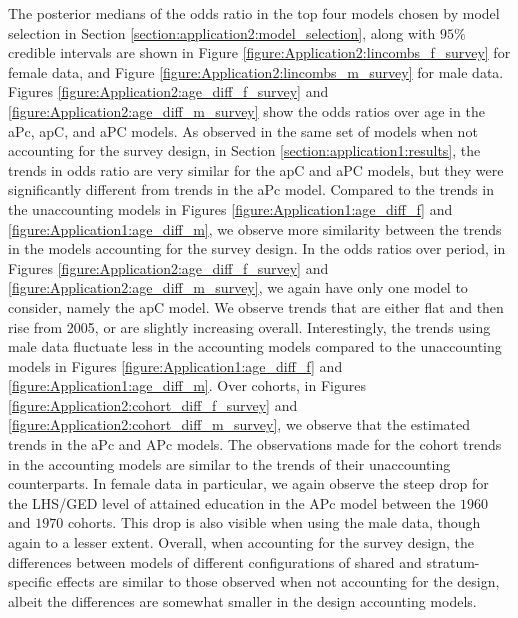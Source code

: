 \vspace{-0.2cm}
The posterior medians of the odds ratio in the top four models chosen by model selection in Section \ref{section:application2:model_selection}, along with $95\%$ credible intervals are shown in Figure \ref{figure:Application2:lincombs_f_survey} for female data, and Figure \ref{figure:Application2:lincombs_m_survey} for male data. Figures \ref{figure:Application2:age_diff_f_survey} and \ref{figure:Application2:age_diff_m_survey} show the odds ratios over age in the aPc, apC, and aPC models. As observed in the same set of models when not accounting for the survey design, in Section \ref{section:application1:results}, the trends in odds ratio are very similar for the apC and aPC models, but they were significantly different from trends in the aPc model. Compared to the trends in the unaccounting models in Figures \ref{figure:Application1:age_diff_f} and \ref{figure:Application1:age_diff_m}, we observe more similarity between the trends in the models accounting for the survey design. In the odds ratios over period, in Figures \ref{figure:Application2:age_diff_f_survey} and \ref{figure:Application2:age_diff_m_survey}, we again have only one model to consider, namely the apC model. We observe trends that are either flat and then rise from 2005, or are slightly increasing overall. Interestingly, the trends using male data fluctuate less in the accounting models compared to the unaccounting models in Figures \ref{figure:Application1:age_diff_f} and \ref{figure:Application1:age_diff_m}. Over cohorts, in Figures \ref{figure:Application2:cohort_diff_f_survey} and \ref{figure:Application2:cohort_diff_m_survey}, we observe that the estimated trends in the aPc and APc models. The observations made for the cohort trends in the accounting models are similar to the trends of their unaccounting counterparts. In female data in particular, we again observe the steep drop for the LHS/GED level of attained education in the APc model between the $1960$ and $1970$ cohorts. This drop is also visible when using the male data, though again to a lesser extent. Overall, when accounting for the survey design, the differences between models of different configurations of shared and stratum-specific effects are similar to those observed when not accounting for the design, albeit the differences are somewhat smaller in the design accounting models.

